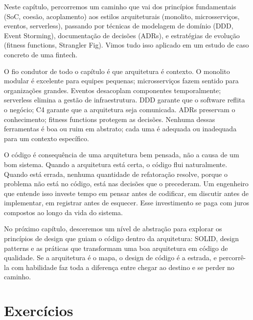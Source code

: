 Neste capítulo, percorremos um caminho que vai dos princípios fundamentais
(SoC, coesão, acoplamento) aos estilos arquiteturais (monolito, microsserviços,
eventos, serverless), passando por técnicas de modelagem de domínio (DDD, Event
Storming), documentação de decisões (ADRs), e estratégias de evolução (fitness
functions, Strangler Fig). Vimos tudo isso aplicado em um estudo de caso
concreto de uma fintech.

O fio condutor de todo o capítulo é que arquitetura é contexto. O monolito
modular é excelente para equipes pequenas; microsserviços fazem sentido para
organizações grandes. Eventos desacoplam componentes temporalmente; serverless
elimina a gestão de infraestrutura. DDD garante que o software reflita o
negócio; C4 garante que a arquitetura seja comunicada. ADRs preservam o
conhecimento; fitness functions protegem as decisões. Nenhuma dessas
ferramentas é boa ou ruim em abstrato; cada uma é adequada ou inadequada
para um contexto específico.

O código é consequência de uma arquitetura bem pensada, não a causa de um bom
sistema. Quando a arquitetura está certa, o código flui naturalmente. Quando
está errada, nenhuma quantidade de refatoração resolve, porque o problema não
está no código, está nas decisões que o precederam. Um engenheiro que entende
isso investe tempo em pensar antes de codificar, em discutir antes de
implementar, em registrar antes de esquecer. Esse investimento se paga com
juros compostos ao longo da vida do sistema.

No próximo capítulo, desceremos um nível de abstração para explorar os princípios
de design que guiam o código dentro da arquitetura: SOLID, design patterns e as
práticas que transformam uma boa arquitetura em código de qualidade. Se a
arquitetura é o mapa, o design de código é a estrada, e percorrê-la com
habilidade faz toda a diferença entre chegar ao destino e se perder no caminho.


\section*{Exercícios}

